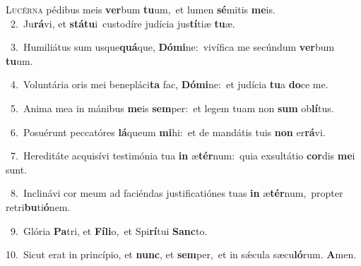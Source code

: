\lettrine{\initial\textcolor{\initialcolor}{L}}{ucérna} pédibus meis \textbf{ver}\-bum \textbf{tu}\-um,~\star et lumen \textbf{sé}\-mitis \textbf{me}\-is.\\
{\numbfont\textcolor{\numbcolor}{~2.}}~Ju\-\textbf{rá}\-vi, et \textbf{stá}\-\textbf{tu}i~\star custodíre judícia jus\-\textbf{tí}\-tiæ \textbf{tu}\-æ.\par
{\numbfont\textcolor{\numbcolor}{~3.}}~Humiliátus sum usque\-\textbf{quá}\-que, \textbf{Dó}\-\textbf{mi}ne:~\star vivífica me secúndum \textbf{ver}\-bum \textbf{tu}\-um.\par
{\numbfont\textcolor{\numbcolor}{~4.}}~Voluntária oris mei benepláci\textbf{ta} fac, \textbf{Dó}\-\textbf{mi}ne:~\star et judícia \textbf{tu}\-a \textbf{do}\-ce me.\par
{\numbfont\textcolor{\numbcolor}{~5.}}~Anima mea in mánibus \textbf{me}\-is \textbf{sem}\-per:~\star et legem tuam non \textbf{sum} ob\-\textbf{lí}\-tus.\par
{\numbfont\textcolor{\numbcolor}{~6.}}~Posuérunt peccatóres \textbf{lá}\-queum \textbf{mi}\-hi:~\star et de mandátis tuis \textbf{non} er\-\textbf{rá}\-vi.\par
{\numbfont\textcolor{\numbcolor}{~7.}}~Hereditáte acquisívi testimónia tua \textbf{in} æ\-\textbf{tér}\-num:~\star quia exsultátio \textbf{cor}\-dis \textbf{me}\-i sunt.\par
{\numbfont\textcolor{\numbcolor}{~8.}}~Inclinávi cor meum ad faciéndas justificatiónes tuas \textbf{in} æ\-\textbf{tér}\-num,~\star propter retri\-\textbf{bu}\-ti\-\textbf{ó}\-nem.\par
{\numbfont\textcolor{\numbcolor}{~9.}}~Glória \textbf{Pa}\-tri, et \textbf{Fí}\-\textbf{li}o,~\star et Spi\-\textbf{rí}\-tui \textbf{Sanc}\-to.\par
{\numbfont\textcolor{\numbcolor}{10.}}~Sicut erat in princípio, et \textbf{nunc}\-, et \textbf{sem}\-per,~\star et in sǽcula sæcu\-\textbf{ló}\-rum. \textbf{A}\-men.\par
